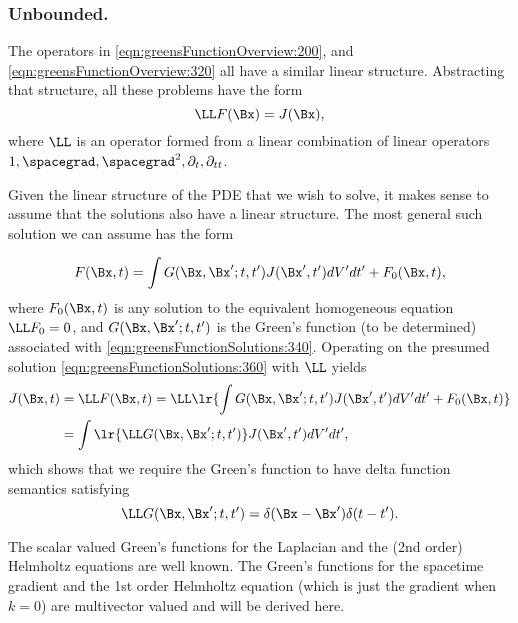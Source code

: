 %
%
\subsubsection{Unbounded.}

The operators in \cref{eqn:greensFunctionOverview:200}, and \cref{eqn:greensFunctionOverview:320} all have a similar linear structure.
Abstracting that structure, all these problems have the form
\begin{equation}\label{eqn:greensFunctionSolutions:340}
\LL F(\Bx) = J(\Bx),
\end{equation}
where \( \LL \) is an operator formed from a linear combination of linear operators \( 1, \spacegrad, \spacegrad^2, \partial_t, \partial_{tt} \).

Given the linear structure of the PDE that we wish to solve, it makes sense to assume that the solutions also have a linear structure.
The most general such solution we can assume has the form

\begin{equation}\label{eqn:greensFunctionSolutions:360}
F(\Bx, t) = \int G(\Bx, \Bx' ; t, t') J(\Bx', t') dV' dt' + F_0(\Bx, t),
\end{equation}
where \( F_0(\Bx, t) \) is any solution to the equivalent homogeneous equation \( \LL F_0 = 0 \), and \( G(\Bx, \Bx' ; t, t') \) is the Green's function (to be determined) associated with \cref{eqn:greensFunctionSolutions:340}.
Operating on the presumed solution
\cref{eqn:greensFunctionSolutions:360} with \( \LL \) yields
\begin{equation}\label{eqn:greensFunctionSolutions:380}
\begin{aligned}
J(\Bx, t) 
&= \LL F(\Bx, t) = \LL\lr{ \int G(\Bx, \Bx' ; t, t') J(\Bx', t') dV' dt' + F_0(\Bx, t) } \\
&= \int \lr{ \LL G(\Bx, \Bx'; t, t') } J(\Bx', t') dV' dt',
\end{aligned}
\end{equation}
which shows that we require the Green's function to have delta function semantics satisfying
\begin{equation}\label{eqn:greensFunctionSolutions:400}
\LL G(\Bx, \Bx' ; t, t') = \delta(\Bx - \Bx') \delta(t - t').
\end{equation}

The scalar valued Green's functions for the Laplacian and the (2nd order) Helmholtz equations are well known.
The Green's functions for the spacetime gradient and the 1st order Helmholtz equation (which is just the gradient when \( k = 0 \)) are multivector valued and will be derived here.

